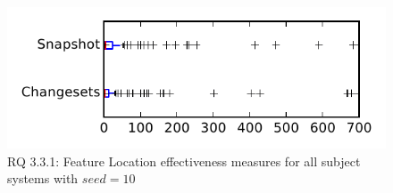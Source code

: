 
\begin{figure}
\centering
\includegraphics[height=0.4\textheight]{figures/flt_seed/rq1_tiny_10}
\caption{RQ 3.3.1: Feature Location effectiveness measures for all subject systems with $seed=10$}
\label{fig:flt_seed:rq1:tiny}
\end{figure}
